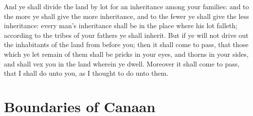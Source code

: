 \begin{biblechapter}
\verse And ye shall divide the land by lot for an inheritance among your families: and to the more ye shall give the more inheritance, and to the fewer ye shall give the less inheritance: every man's inheritance shall be in the place where his lot falleth; according to the tribes of your fathers ye shall inherit.
\verse But if ye will not drive out the inhabitants of the land from before you; then it shall come to pass, that those which ye let remain of them shall be pricks in your eyes, and thorns in your sides, and shall vex you in the land wherein ye dwell.
\verse Moreover it shall come to pass, that I shall do unto you, as I thought to do unto them.
\end{biblechapter}

\section*{Boundaries of Canaan}
